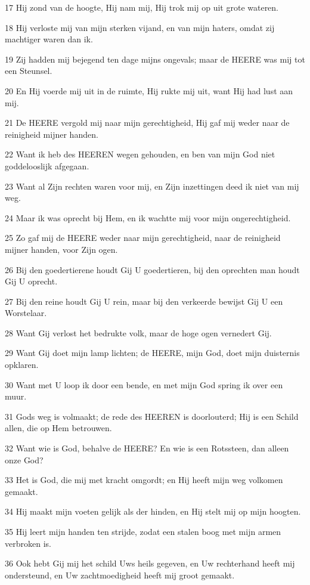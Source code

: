 \par 17 Hij zond van de hoogte, Hij nam mij, Hij trok mij op uit grote wateren.
\par 18 Hij verloste mij van mijn sterken vijand, en van mijn haters, omdat zij machtiger waren dan ik.
\par 19 Zij hadden mij bejegend ten dage mijns ongevals; maar de HEERE was mij tot een Steunsel.
\par 20 En Hij voerde mij uit in de ruimte, Hij rukte mij uit, want Hij had lust aan mij.
\par 21 De HEERE vergold mij naar mijn gerechtigheid, Hij gaf mij weder naar de reinigheid mijner handen.
\par 22 Want ik heb des HEEREN wegen gehouden, en ben van mijn God niet goddelooslijk afgegaan.
\par 23 Want al Zijn rechten waren voor mij, en Zijn inzettingen deed ik niet van mij weg.
\par 24 Maar ik was oprecht bij Hem, en ik wachtte mij voor mijn ongerechtigheid.
\par 25 Zo gaf mij de HEERE weder naar mijn gerechtigheid, naar de reinigheid mijner handen, voor Zijn ogen.
\par 26 Bij den goedertierene houdt Gij U goedertieren, bij den oprechten man houdt Gij U oprecht.
\par 27 Bij den reine houdt Gij U rein, maar bij den verkeerde bewijst Gij U een Worstelaar.
\par 28 Want Gij verlost het bedrukte volk, maar de hoge ogen vernedert Gij.
\par 29 Want Gij doet mijn lamp lichten; de HEERE, mijn God, doet mijn duisternis opklaren.
\par 30 Want met U loop ik door een bende, en met mijn God spring ik over een muur.
\par 31 Gods weg is volmaakt; de rede des HEEREN is doorlouterd; Hij is een Schild allen, die op Hem betrouwen.
\par 32 Want wie is God, behalve de HEERE? En wie is een Rotssteen, dan alleen onze God?
\par 33 Het is God, die mij met kracht omgordt; en Hij heeft mijn weg volkomen gemaakt.
\par 34 Hij maakt mijn voeten gelijk als der hinden, en Hij stelt mij op mijn hoogten.
\par 35 Hij leert mijn handen ten strijde, zodat een stalen boog met mijn armen verbroken is.
\par 36 Ook hebt Gij mij het schild Uws heils gegeven, en Uw rechterhand heeft mij ondersteund, en Uw zachtmoedigheid heeft mij groot gemaakt.

